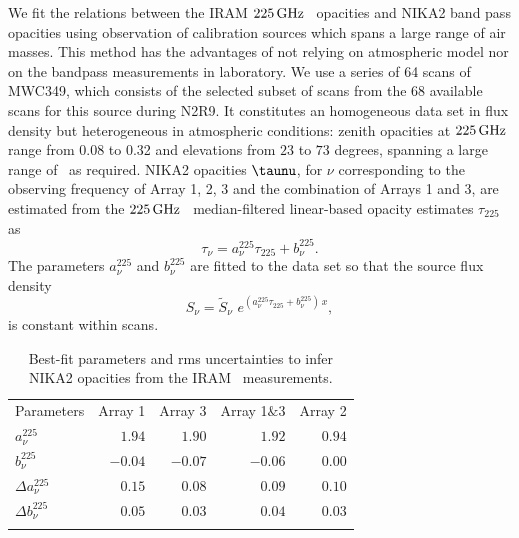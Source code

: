 We fit the relations between the IRAM
$225\,\rm{GHz}$ \taumeter\ opacities and NIKA2 band pass opacities using
observation of calibration sources which spans a large range of air
masses. This method has the advantages of not relying on atmospheric
model nor on the bandpass measurements in laboratory.
We use a series of 64 scans of MWC349, which consists of the
\baseline selected subset of scans from the 68 available scans for
this source during N2R9.
It constitutes an homogeneous data set in flux density but
heterogeneous in atmospheric conditions: zenith opacities at
$225\,\rm{GHz}$ range from 0.08 to 0.32 and elevations from $23$ to $73$
degrees, spanning a large range of \airmass\ as required.
NIKA2 opacities $\taunu$, for $\nu$ corresponding to the observing
frequency of Array 1, 2, 3 and the combination of Arrays 1 and 3, are estimated
from the $225\,\rm{GHz}$ \taumeter\ median-filtered linear-based opacity
estimates $\tau_{225}$ as
\begin{equation}  
  \tau_\nu =  a_\nu^{225}\tau_{225} + b_\nu^{225}.          
\end{equation}
The parameters $a_\nu^{225}$ and $b_\nu^{225}$ are fitted
to the data set so that the source flux density %
\begin{equation}  
  S_\nu = \tilde{S}_\nu\,\, e^{(a_\nu^{225}\tau_{225} + b_\nu^{225}) \, x}, 
  \label{eq:opacorr_taumeter}
\end{equation}
is constant within scans.

\begin{table}[!htbp]
  \begin{center}
    \caption[IRAM \taumeter\ to NIKA2 opacity model]{{\lp Best-fit
    parameters and rms uncertainties to infer NIKA2 opacities from the IRAM \taumeter\ measurements.}}
    \label{tab:tau225-to-taunika}  
    \begin{tabular}{lrrrr}
      \hline
      \hline
      \noalign{\smallskip}
      Parameters & Array 1 & Array 3  & Array 1$\&$3 & Array 2  \\
      \noalign{\smallskip}
      \hline
      \noalign{\smallskip}
      $a_\nu^{225}$         & $1.94$   &  $1.90$ &  $1.92$ & $0.94$ \\
      $b_\nu^{225}$         & $-0.04$  & $-0.07$ & $-0.06$ & $0.00$ \\
      $\Delta a_\nu^{225}$  & $0.15$  & $0.08$  &  $0.09$ & $0.10$ \\
      $\Delta b_\nu^{225}$  & $0.05$  & $0.03$  & $0.04$ & $0.03$ \\
      \noalign{\smallskip}
      \hline
    \end{tabular}
  \end{center}    
\end{table}

